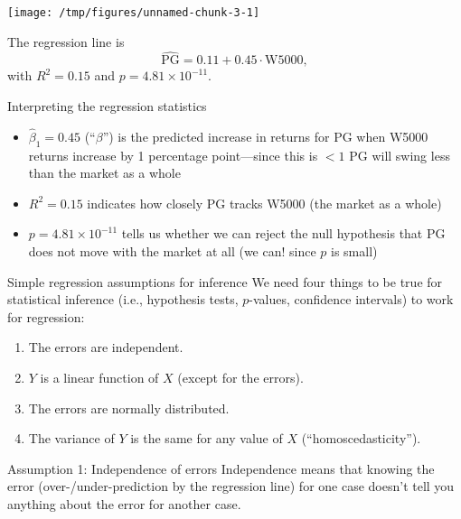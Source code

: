 \documentclass{beamer}\usepackage[]{graphicx}\usepackage[]{color}
\makeatletter
\def\maxwidth{ %
  \ifdim\Gin@nat@width>\linewidth
    \linewidth
  \else
    \Gin@nat@width
  \fi
}
\newenvironment{knitrout}{}{} %
\makeatother
\begin{document}
\begin{darkframes}
    \begin{frame}[fragile]
\begin{knitrout}
\color{fgcolor}
\texttt{[image: /tmp/figures/unnamed-chunk-3-1]} 

\end{knitrout}

      The regression line is
      \[
        \widehat{\text{PG}} = 0.11 + 0.45 \cdot\text{W5000},
      \]
      with $R^2=0.15$ and $p=\ensuremath{4.81\times 10^{-11}}$.
      
    \end{frame}

    \begin{frame}{Interpreting the regression statistics}
      \begin{itemize}[<+->]
        \item $\hat\beta_1=0.45$ (``$\beta$'') is the predicted increase in returns for PG when W5000 returns increase by 1 percentage point---since this is $<1$ PG will swing less than the market as a whole
        \item $R^2=0.15$ indicates how closely PG tracks W5000 (the market as a whole)
        \item $p=\ensuremath{4.81\times 10^{-11}}$ tells us whether we can reject the null hypothesis that PG does not move with the market at all \pause (we can! since $p$ is small)
      \end{itemize}
    \end{frame}

    \begin{frame}{Simple regression assumptions for inference}
      We need four things to be true for statistical inference (i.e., hypothesis tests, $p$-values, confidence intervals) to work for regression:
      \pause
      \begin{enumerate}
        \item The errors are independent.
        \item $Y$ is a linear function of $X$ (except for the errors).
        \item The errors are normally distributed.
        \item The variance of $Y$ is the same for any value of $X$ (``homoscedasticity'').
      \end{enumerate}
    \end{frame}

    \begin{frame}{Assumption 1: Independence of errors}
      Independence means that knowing the error (over-/under-prediction by the regression line) for one case doesn't tell you anything about the error for another case.
    \end{frame}


\end{darkframes}
\end{document}
